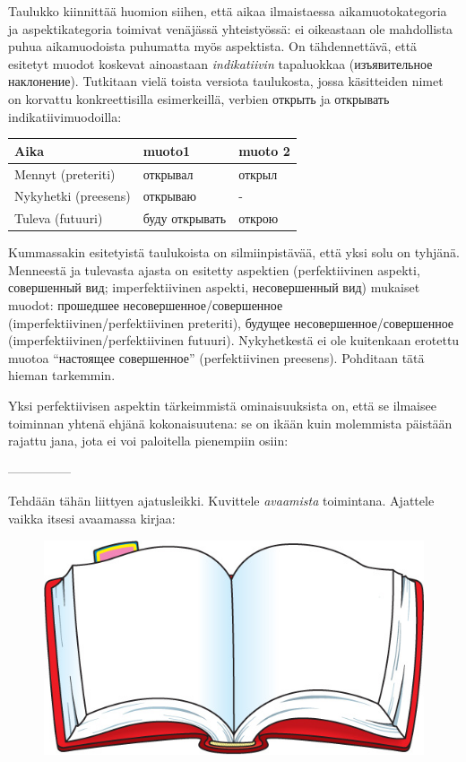 \documentclass[]{scrreprt}
\begin{document}
Taulukko kiinnittää huomion siihen, että aikaa ilmaistaessa
aikamuotokategoria ja aspektikategoria toimivat venäjässä yhteistyössä:
ei oikeastaan ole mahdollista puhua aikamuodoista puhumatta myös
aspektista. On tähdennettävä, että esitetyt muodot koskevat ainoastaan
\emph{indikatiivin} tapaluokkaa (изъявительное наклонение). Tutkitaan
vielä toista versiota taulukosta, jossa käsitteiden nimet on korvattu
konkreettisilla esimerkeillä, verbien открыть ja открывать
indikatiivimuodoilla:

\begin{longtable}[c]{@{}lll@{}}
\toprule
Aika & muoto1 & muoto 2\tabularnewline
\midrule
\endhead
Mennyt (preteriti) & открывал & открыл\tabularnewline
Nykyhetki (preesens) & открываю & -\tabularnewline
Tuleva (futuuri) & буду открывать & открою\tabularnewline
\bottomrule
\end{longtable}

Kummassakin esitetyistä taulukoista on silmiinpistävää, että yksi solu
on tyhjänä. Menneestä ja tulevasta ajasta on esitetty aspektien
(perfektiivinen aspekti, совершенный вид; imperfektiivinen aspekti,
несовершенный вид) mukaiset muodot: прошедшее несовершенное/совершенное
(imperfektiivinen/perfektiivinen preteriti), будущее
несовершенное/совершенное (imperfektiivinen/perfektiivinen futuuri).
Nykyhetkestä ei ole kuitenkaan erotettu muotoa ``настоящее совершенное''
(perfektiivinen preesens). Pohditaan tätä hieman tarkemmin.

Yksi perfektiivisen aspektin tärkeimmistä ominaisuuksista on, että se
ilmaisee toiminnan yhtenä ehjänä kokonaisuutena: se on ikään kuin
molemmista päistään rajattu jana, jota ei voi paloitella pienempiin
osiin:

\textbar{}---------------\textbar{}

Tehdään tähän liittyen ajatusleikki. Kuvittele \emph{avaamista}
toimintana. Ajattele vaikka itsesi avaamassa kirjaa:

\begin{figure}[htbp]
\centering
\includegraphics{../figure/openbook.jpeg}
\caption{}
\end{figure}
\end{document}
